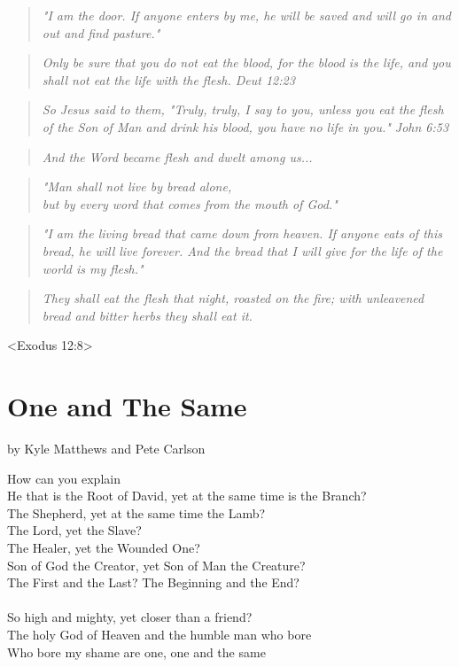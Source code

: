 \documentclass[10pt,oneside,footinclude=true,headinclude=true]{scrbook} %
\newcommand\quot[1]{
	\begin{quote}\textit{\small#1}\end{quote}
}
\begin{document}
\quot{"I am the door. If anyone enters by me, he will be saved and will go in and out and find pasture."}

\quot{Only be sure that you do not eat the blood, for the blood is the life, and you shall not eat the life with the flesh. Deut 12:23}

\quot{So Jesus said to them, "Truly, truly, I say to you, unless you eat the flesh of the Son of Man and drink his blood, you have no life in you." John 6:53}

\quot{And the Word became flesh and dwelt among us...}

\quot{"Man shall not live by bread alone,\\
\hspace*{5mm}but by every word that comes from the mouth of God."}

\quot{"I am the living bread that came down from heaven. If anyone eats of this bread, he will live forever. And the bread that I will give for the life of the world is my flesh."}

\quot{They shall eat the flesh that night, roasted on the fire; with unleavened bread and bitter herbs they shall eat it.}
<Exodus 12:8>


\chapter{One and The Same}
by Kyle Matthews and Pete Carlson

How can you explain\\
He that is the Root of David, yet at the same time is the Branch?\\
The Shepherd, yet at the same time the Lamb?\\
The Lord, yet the Slave?\\
The Healer, yet the Wounded One?\\
Son of God the Creator, yet Son of Man the Creature?\\
The First and the Last? The Beginning and the End?\\
\\
So high and mighty, yet closer than a friend?\\
The holy God of Heaven and the humble man who bore\\
Who bore my shame are one, one and the same\\
\end{document}
